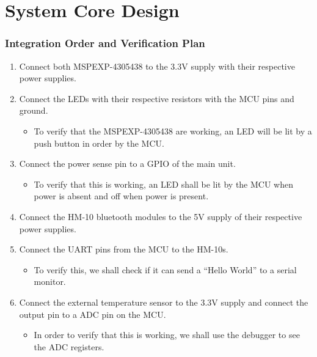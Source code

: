 \section{System Core Design}
\subsubsection{Integration Order and Verification Plan}
\begin{enumerate}
  \item Connect both MSPEXP-4305438 to the 3.3\si{\V} supply with their respective power supplies.
  \item Connect the LEDs with their respective resistors with the MCU pins and ground.
        \begin{itemize}
         \item To verify that the MSPEXP-4305438 are working, an LED will be lit by a push button in order by the MCU.
        \end{itemize}
  \item Connect the power sense pin to a GPIO of the main unit.
        \begin{itemize}
         \item  To verify that this is working, an LED shall be lit by the MCU when power is absent and off when power is present.
        \end{itemize}
  \item Connect the HM-10 bluetooth modules to the 5\si{\V} supply of their respective power supplies.
  \item Connect the UART pins from the MCU to the HM-10s.
        \begin{itemize}
         \item To verify this, we shall check if it can send a ``Hello World'' to a serial monitor.
        \end{itemize}
  \item Connect the external temperature sensor to the 3.3\si{\V} supply and connect the output pin to a ADC pin on the MCU.
        \begin{itemize}
         \item In order to verify that this is working, we shall use the debugger to see the ADC registers.
        \end{itemize}
\end{enumerate}
